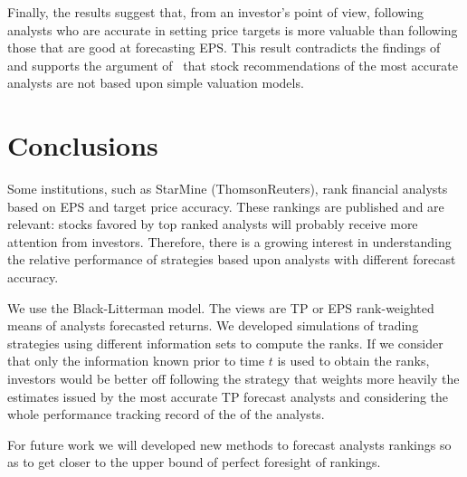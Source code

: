 \documentclass[a4paper,twoside,12pt,openright,notitlepage]{report}\usepackage[]{graphicx}\usepackage[]{color}
\begin{document}


Finally, the results suggest that, from an investor's point of view, following analysts who are accurate in setting price targets is more valuable than following those that are good at forecasting EPS.  This result contradicts the findings of~\cite{bradshaw2004} and supports the argument of~\cite{simon2011} that stock recommendations of the most accurate analysts are not based upon simple valuation models.

\section{Conclusions}
\label{ch1-sec:conclusion}

Some institutions, such as StarMine (ThomsonReuters), rank financial analysts based on EPS and target price accuracy. These rankings are published and are relevant: stocks favored by top ranked analysts will probably receive more attention from investors. Therefore, there is a growing interest in understanding the relative performance of strategies based upon analysts with different forecast accuracy.

We use the Black-Litterman model. The views are TP or EPS rank-weighted means of analysts forecasted returns. We developed simulations of trading strategies using different information sets to compute the ranks. If we consider that only the information known prior to time $t$ is used to obtain the ranks, investors would be better off following the strategy that weights more heavily the estimates issued  by the most accurate TP forecast analysts and considering the whole performance tracking record of the of the analysts.


For future work we will developed new methods to forecast analysts rankings so as to get closer to the upper bound of perfect foresight of rankings.
\processdelayedfloats
\cleardoublepage
\end{document}
